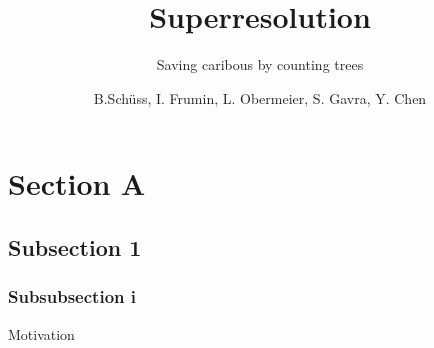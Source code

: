 \documentclass[aspectratio=43]{beamer}
\title{Superresolution}
\author{B.Schüss, I. Frumin, L. Obermeier, S. Gavra, Y. Chen}
\subtitle{Saving caribous by counting trees}
\institute[DBS]{Team4 - Praktikum Big Data Science}
\begin{document}
\begin{frame}[plain]
\titlepage
\end{frame}

\section{Section A}

\subsection{Subsection 1}

\subsubsection{Subsubsection i}

\begin{frame}{Motivation}


\end{frame}
\end{document}
